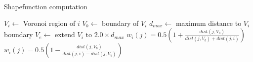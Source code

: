 \begin{algorithm}[!h]
	\caption[Frame-based cutting: Shapefunction computation]{\label{alg:shapefunctioncomputation}Shapefunction computation}
	\begin{algorithmic}[1]
		\State $V_{i} \gets$ Voronoi region of $i$
		\State $V_{b} \gets$ boundary of $V_{i}$	
		\State $d_{max} \gets$ maximum distance to $V_{i}$ boundary
		\State $V_{e} \gets$ extend $V_{i}$ to $2.0 \times d_{max}$
		\State $\displaystyle w_{i}(j) = 0.5\left(1 + \frac{dist(j,V_{b})}{dist(j,V_{b})+dist(j,i)}\right)$
		\State $\displaystyle w_{i}(j) = 0.5\left(1 - \frac{dist(j,V_{b})}{dist(j,i)-dist(j,V_{b})}\right)$
		\EndIf
		\EndFor
		\EndFor
		\EndProcedure
	\end{algorithmic}
\end{algorithm}

